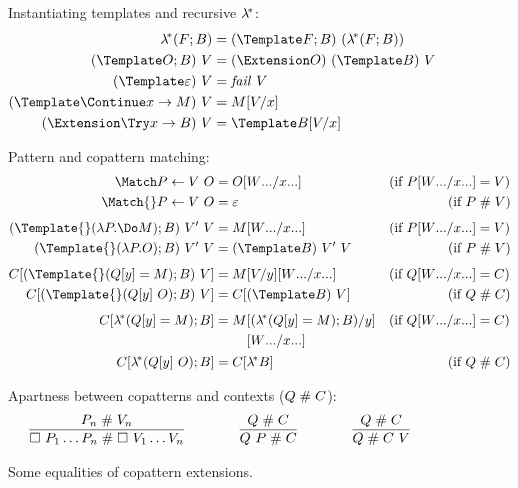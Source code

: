 \begin{figure}
Instantiating templates and recursive $\lambda^{\!*}$:
\begin{align*}
  \lamstar (F; B)
  &=
  (\Template F; B) ~ (\lamstar (F; B))
  \\
  (\Template O; B) ~ V
  &=
  (\Extension O) ~ (\Template B) ~ V
  \\
  (\Template \varepsilon) ~ V
  &=
  \mathit{fail}~V
  \\
  (\Template \Continue x \to M) ~ V
  &=
  M\subst{x}{V}
  \\
  (\Extension \Try x \to B) ~ V
  &=
  \Template B\subst{x}{V}
\end{align*}

Pattern and copattern matching:
\begin{align*}
  \Match P \gets V ~ O
  &=
  O\subst{\many{x}}{\many{W}}
  &(\text{if } P\subst{\many{x}}{\many{W}} &= V)
  \\
  \Match{} P \gets V ~ O
  &=
  \varepsilon
  &(\text{if } P &\apart V)
  \\[1ex]
  (\Template{} (\lambda P. \Do M); B) ~ V' ~ V
  &=
  M\subst{\many{x}}{\many{W}}
  &(\text{if } P\subst{\many{x}}{\many{W}} &= V)
  \\
  (\Template{} (\lambda P. O); B) ~ V' ~ V
  &=
  (\Template B) ~ V' ~ V
  &(\text{if } P &\apart V)
  \\[1ex]
  C[(\Template{} (Q[y] = M); B) ~ V]
  &=
  M\subst{y}{V}\subst{\many{x}}{\many{W}}
  &(\text{if } Q\subst{\many{x}}{\many{W}} &= C)
  \\
  C[(\Template{} (Q[y] ~ O); B) ~ V]
  &=
  C[(\Template B) ~ V]
  &(\text{if } Q &\apart C)
  \\[1ex]
  C[\lamstar (Q[y] = M); B]
  &=
  \begin{aligned}[t]
    M
    &\subst{y}{(\lamstar (Q[y] = M); B)}
    \\
    &\subst{\many{x}}{\many{W}}
  \end{aligned}
  &(\text{if } Q\subst{\many{x}}{\many{W}} &= C)
  \\
  C[\lamstar (Q[y] ~ O); B]
  &=
  C[\lamstar B]
  &(\text{if } Q &\apart C)
\end{align*}

Apartness between copatterns and contexts ($Q \mathrel{\#} C$):
\begin{gather*}
  \infer
  {\hole ~ P_1 \dots P_n \apart \hole ~ V_1 \dots V_n}
  {P_n \apart V_n}
  \qqqquad
  \infer
  {Q ~ P \apart C}
  {Q \apart C}
  \qqqquad
  \infer
  {Q \apart C ~ V}
  {Q \apart C}
\end{gather*}

\caption{Some equalities of copattern extensions.}
\label{fig:source-equality}
\end{figure}

